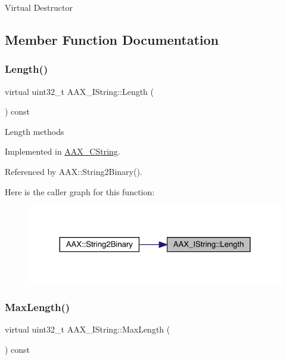 Virtual Destructor 

\subsection{Member Function Documentation}
\mbox{\label{a01873_a4d4440bf68aa5ae4bf3dc6639cbf95c9}} 
\subsubsection{\texorpdfstring{Length()}{Length()}}
{\footnotesize\ttfamily virtual uint32\+\_\+t A\+A\+X\+\_\+\+I\+String\+::\+Length (\begin{DoxyParamCaption}{ }\end{DoxyParamCaption}) const\hspace{0.3cm}{\ttfamily [pure virtual]}}

Length methods 

Implemented in \mbox{\hyperlink{a01573_a34ccfa250b53a721417f32d4a74bfed6}{A\+A\+X\+\_\+\+C\+String}}.



Referenced by A\+A\+X\+::\+String2\+Binary().

Here is the caller graph for this function\+:
\nopagebreak
\begin{figure}[H]
\begin{center}
\leavevmode
\includegraphics[width=324pt]{a01873_a4d4440bf68aa5ae4bf3dc6639cbf95c9_icgraph}
\end{center}
\end{figure}
\mbox{\label{a01873_aa898760d69880aeefbd42c0109889c59}} 
\subsubsection{\texorpdfstring{MaxLength()}{MaxLength()}}
{\footnotesize\ttfamily virtual uint32\+\_\+t A\+A\+X\+\_\+\+I\+String\+::\+Max\+Length (\begin{DoxyParamCaption}{ }\end{DoxyParamCaption}) const\hspace{0.3cm}{\ttfamily [pure virtual]}}



